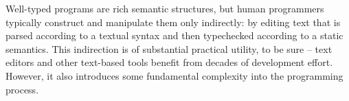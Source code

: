






Well-typed programs are rich semantic structures, but human programmers typically construct and manipulate them only indirectly: by editing text that is parsed according to a textual syntax and then typechecked according to a static semantics. This indirection is of substantial practical utility, to be sure -- text editors and other text-based tools benefit from decades of development effort. However, it also introduces some fundamental complexity into the programming process. 

